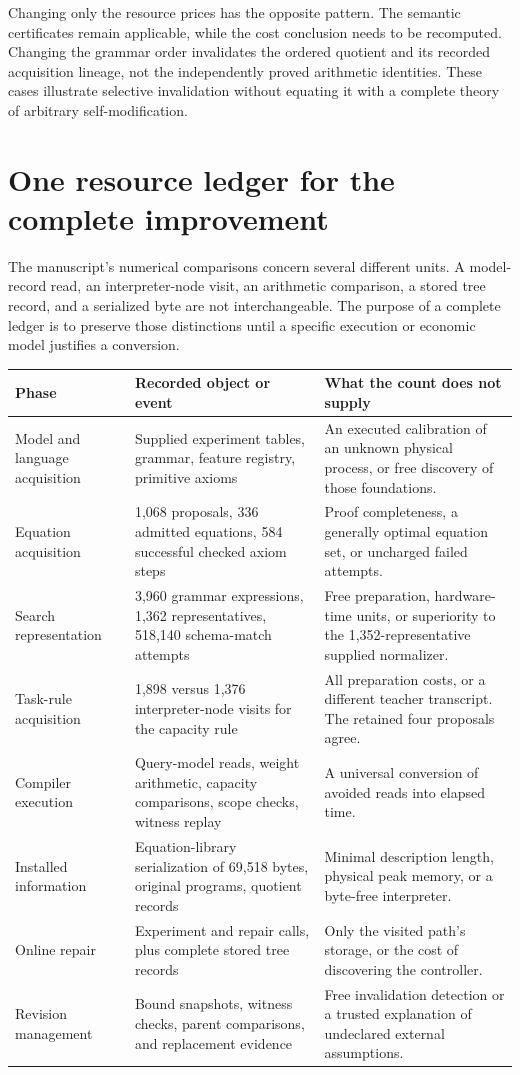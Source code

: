 \documentclass[11pt,letterpaper]{article}
\theoremstyle{plain}
\theoremstyle{definition}
\begin{document}
Changing only the resource prices has the opposite pattern. The semantic certificates remain applicable, while the cost conclusion needs to be recomputed. Changing the grammar order invalidates the ordered quotient and its recorded acquisition lineage, not the independently proved arithmetic identities. These cases illustrate selective invalidation without equating it with a complete theory of arbitrary self-modification.

\section{One resource ledger for the complete improvement}\label{sec:integrated-ledger}
The manuscript's numerical comparisons concern several different units. A model-record read, an interpreter-node visit, an arithmetic comparison, a stored tree record, and a serialized byte are not interchangeable. The purpose of a complete ledger is to preserve those distinctions until a specific execution or economic model justifies a conversion.

\begin{small}\begin{longtable}{@{}P{.25\textwidth}P{.34\textwidth}P{.33\textwidth}@{}}\toprule
Phase & Recorded object or event & What the count does not supply\\\midrule\endhead
Model and language acquisition & Supplied experiment tables, grammar, feature registry, primitive axioms & An executed calibration of an unknown physical process, or free discovery of those foundations.\\
Equation acquisition & 1,068 proposals, 336 admitted equations, 584 successful checked axiom steps & Proof completeness, a generally optimal equation set, or uncharged failed attempts.\\
Search representation & 3,960 grammar expressions, 1,362 representatives, 518,140 schema-match attempts & Free preparation, hardware-time units, or superiority to the 1,352-representative supplied normalizer.\\
Task-rule acquisition & 1,898 versus 1,376 interpreter-node visits for the capacity rule & All preparation costs, or a different teacher transcript. The retained four proposals agree.\\
Compiler execution & Query-model reads, weight arithmetic, capacity comparisons, scope checks, witness replay & A universal conversion of avoided reads into elapsed time.\\
Installed information & Equation-library serialization of 69,518 bytes, original programs, quotient records & Minimal description length, physical peak memory, or a byte-free interpreter.\\
Online repair & Experiment and repair calls, plus complete stored tree records & Only the visited path's storage, or the cost of discovering the controller.\\
Revision management & Bound snapshots, witness checks, parent comparisons, and replacement evidence & Free invalidation detection or a trusted explanation of undeclared external assumptions.\\\bottomrule
\end{longtable}\end{small}
\end{document}
